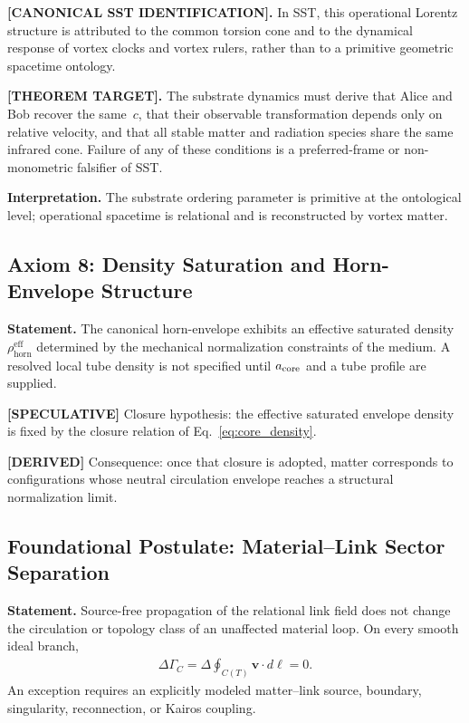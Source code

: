 \documentclass[11pt]{article}
\theoremstyle{definition}
\theoremstyle{plain}
\theoremstyle{remark}
\newcommand{\rhohorn}{\rho_{\mathrm{horn}}^{\mathrm{eff}}}
\begin{document}
        \textbf{[CANONICAL SST IDENTIFICATION].}
        In SST, this operational Lorentz structure is attributed to the common torsion cone and to the dynamical response of vortex clocks and vortex rulers, rather than to a primitive geometric spacetime ontology.

        \textbf{[THEOREM TARGET].}
        The substrate dynamics must derive that Alice and Bob recover the same~\(c\), that their observable transformation depends only on relative velocity, and that all stable matter and radiation species share the same infrared cone. Failure of any of these conditions is a preferred-frame or non-monometric falsifier of SST.

        \textbf{Interpretation.}
        The substrate ordering parameter is primitive at the ontological level; operational spacetime is relational and is reconstructed by vortex matter.
    
    \subsection{Axiom 8: Density Saturation and Horn-Envelope Structure}
        
        \textbf{Statement.}
        The canonical horn-envelope exhibits an effective saturated density
        \(\rhohorn\) determined by the mechanical normalization constraints of the
        medium. A resolved local tube density is not specified until
        \(a_{\rm core}\) and a tube profile are supplied.
        
        \textbf{[SPECULATIVE]} Closure hypothesis: the effective saturated
        envelope density is fixed by the closure relation of Eq.~\eqref{eq:core_density}.

        \textbf{[DERIVED]} Consequence: once that closure is adopted, matter
        corresponds to configurations whose neutral circulation envelope reaches
        a structural normalization limit.
    
    \subsection{Foundational Postulate: Material--Link Sector Separation}
        \label{subsec:material_link_sector_separation_postulate}

        \textbf{Statement.}
        Source-free propagation of the relational link field does not change the
        circulation or topology class of an unaffected material loop.  On every
        smooth ideal branch,
        \begin{align}
            \Delta\Gamma_C
            =
            \Delta\oint_{C(T)}\mathbf v\cdot d\boldsymbol\ell
            =0.
            \label{eq:r_phase_helmholtz_sector_gate}
        \end{align}
        An exception requires an explicitly modeled matter--link source, boundary,
        singularity, reconnection, or Kairos coupling.
\end{document}
